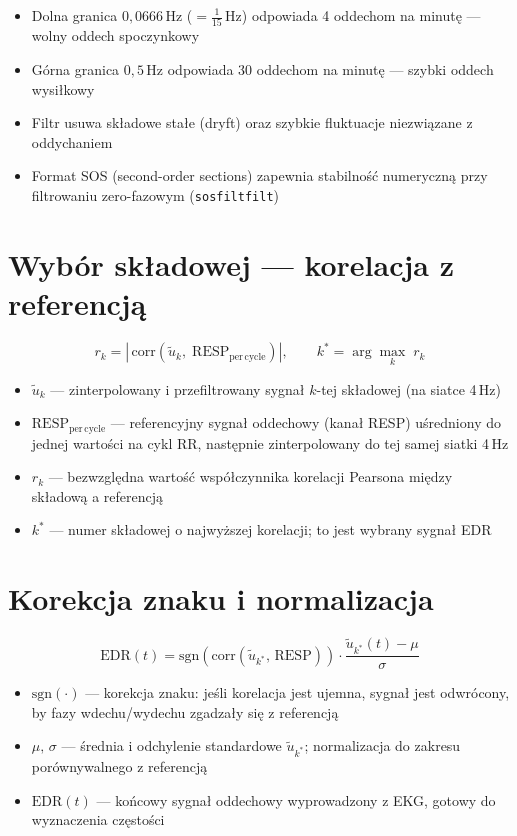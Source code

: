 \documentclass[12pt]{article}
\begin{document}
\begin{itemize}
  \item Dolna granica $0{,}0666$\,Hz ($= \tfrac{1}{15}$\,Hz) odpowiada 4 oddechom na minutę — wolny oddech spoczynkowy
  \item Górna granica $0{,}5$\,Hz odpowiada 30 oddechom na minutę — szybki oddech wysiłkowy
  \item Filtr usuwa składowe stałe (dryft) oraz szybkie fluktuacje niezwiązane z oddychaniem
  \item Format SOS (second-order sections) zapewnia stabilność numeryczną przy filtrowaniu zero-fazowym (\texttt{sosfiltfilt})
\end{itemize}

\section*{Wybór składowej — korelacja z referencją}

\[
  r_k = \left|\,\mathrm{corr}\!\left(\tilde{u}_k,\; \mathrm{RESP}_{\mathrm{per\,cycle}}\right)\right|,
  \qquad
  k^{*} = \arg\max_{k}\; r_k
\]

\begin{itemize}
  \item $\tilde{u}_k$ — zinterpolowany i przefiltrowany sygnał $k$-tej składowej (na siatce 4\,Hz)
  \item $\mathrm{RESP}_{\mathrm{per\,cycle}}$ — referencyjny sygnał oddechowy (kanał RESP) uśredniony do jednej wartości na cykl RR, następnie zinterpolowany do tej samej siatki 4\,Hz
  \item $r_k$ — bezwzględna wartość współczynnika korelacji Pearsona między składową a referencją
  \item $k^{*}$ — numer składowej o najwyższej korelacji; to jest wybrany sygnał EDR
\end{itemize}

\section*{Korekcja znaku i normalizacja}

\[
  \mathrm{EDR}(t) =
  \mathrm{sgn}\!\left(\mathrm{corr}(\tilde{u}_{k^*},\,\mathrm{RESP})\right)
  \cdot \frac{\tilde{u}_{k^*}(t) - \mu}{\sigma}
\]

\begin{itemize}
  \item $\mathrm{sgn}(\cdot)$ — korekcja znaku: jeśli korelacja jest ujemna, sygnał jest odwrócony, by fazy wdechu/wydechu zgadzały się z referencją
  \item $\mu,\, \sigma$ — średnia i odchylenie standardowe $\tilde{u}_{k^*}$; normalizacja do zakresu porównywalnego z referencją
  \item $\mathrm{EDR}(t)$ — końcowy sygnał oddechowy wyprowadzony z EKG, gotowy do wyznaczenia częstości
\end{itemize}
\end{document}
